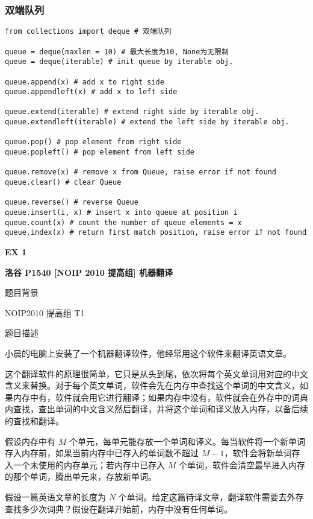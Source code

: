 \documentclass[../main]{subfiles}
\begin{document}
\subsubsection{双端队列}

\begin{lstlisting}[style = Python]
from collections import deque # 双端队列

queue = deque(maxlen = 10) # 最大长度为10, None为无限制
queue = deque(iterable) # init queue by iterable obj.

queue.append(x) # add x to right side
queue.appendleft(x) # add x to left side

queue.extend(iterable) # extend right side by iterable obj.
queue.extendleft(iterable) # extend the left side by iterable obj.

queue.pop() # pop element from right side 
queue.popleft() # pop element from left side

queue.remove(x) # remove x from Queue, raise error if not found
queue.clear() # clear Queue

queue.reverse() # reverse Queue
queue.insert(i, x) # insert x into queue at position i
queue.count(x) # count the number of queue elements = x
queue.index(x) # return first match position, raise error if not found

\end{lstlisting}

\textbf{EX 1}

\textbf{洛谷 P1540 [NOIP 2010 提高组] 机器翻译}

题目背景

NOIP2010 提高组 T1

题目描述

小晨的电脑上安装了一个机器翻译软件，他经常用这个软件来翻译英语文章。

这个翻译软件的原理很简单，它只是从头到尾，依次将每个英文单词用对应的中文含义来替换。对于每个英文单词，软件会先在内存中查找这个单词的中文含义，如果内存中有，软件就会用它进行翻译；如果内存中没有，软件就会在外存中的词典内查找，查出单词的中文含义然后翻译，并将这个单词和译义放入内存，以备后续的查找和翻译。

假设内存中有 $M$ 个单元，每单元能存放一个单词和译义。每当软件将一个新单词存入内存前，如果当前内存中已存入的单词数不超过 $M-1$，软件会将新单词存入一个未使用的内存单元；若内存中已存入 $M$ 个单词，软件会清空最早进入内存的那个单词，腾出单元来，存放新单词。

假设一篇英语文章的长度为 $N$ 个单词。给定这篇待译文章，翻译软件需要去外存查找多少次词典？假设在翻译开始前，内存中没有任何单词。
\end{document}
